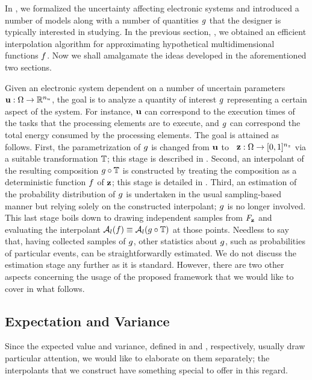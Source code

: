 In , we formalized the uncertainty affecting electronic systems
and introduced a number of models along with a number of quantities $g$ that
the designer is typically interested in studying. In the previous section,
, we obtained an efficient interpolation algorithm for
approximating hypothetical multidimensional functions $f$. Now we shall
amalgamate the ideas developed in the aforementioned two sections.

Given an electronic system dependent on a number of uncertain parameters $\mathbf{u}:
\Omega \to \mathbb{R}^{n_u}$, the goal is to analyze a quantity of interest $g$
representing a certain aspect of the system. For instance, $\mathbf{u}$ can correspond
to the execution times of the tasks that the processing elements are to execute,
and $g$ can correspond the total energy consumed by the processing elements.
The goal is attained as follows. First, the parametrization of $g$ is changed
from $\mathbf{u}$ to \rvs\ $\mathbf{z}: \Omega \to [0, 1]^{n_z}$ via a suitable
transformation $\mathbb{T}$; this stage is described in .
Second, an interpolant of the resulting composition $g \circ \mathbb{T}$
is constructed by treating the composition as a deterministic function $f$ of
$\mathbf{z}$; this stage is detailed in . Third, an estimation of
the probability distribution of $g$ is undertaken in the usual sampling-based
manner but relying solely on the constructed interpolant; $g$ is no longer
involved. This last stage boils down to drawing independent samples from
$F_{\mathbf{z}}$ and evaluating the interpolant $\mathcal{A}_{l}(f)
\equiv \mathcal{A}_{l}(g \circ \mathbb{T})$ at those points. Needless
to say that, having collected samples of $g$, other statistics about $g$, such
as probabilities of particular events, can be straightforwardly estimated. We do
not discuss the estimation stage any further as it is standard. However, there
are two other aspects concerning the usage of the proposed framework that we
would like to cover in what follows.

\subsection{Expectation and Variance} 
Since the expected value and variance, defined in  and
, respectively, usually draw particular attention, we would like
to elaborate on them separately; the interpolants that we construct have
something special to offer in this regard.

